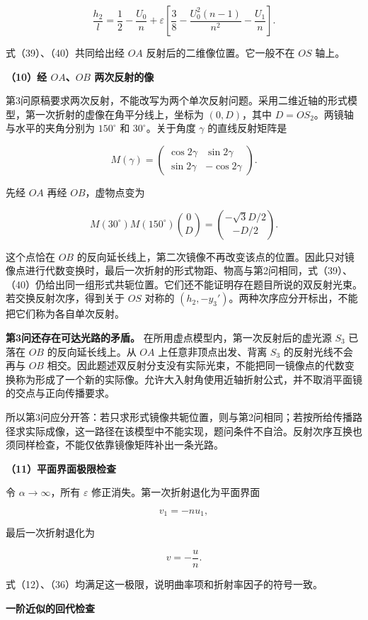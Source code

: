 \documentclass[12pt,a4paper,UTF8]{ctexart}
\begin{document}
\[
\boxed{
\frac{h_2}{l}
=\frac12-\frac{U_0}{n}
+\varepsilon
\left[
\frac38-\frac{U_0^2(n-1)}{n^2}-\frac{U_1}{n}
\right]
}.
\tag{40}
\]

式（39）、（40）共同给出经 \(OA\) 反射后的二维像位置。它一般不在 \(OS\)
轴上。

\textbf{（10）经 \(OA\)、\(OB\) 两次反射的像}

第3问原稿要求两次反射，不能改写为两个单次反射问题。采用二维近轴的形式模型，第一次折射的虚像在角平分线上，坐标为
\((0,D)\)，其中 \(D=OS_2\)。两镜轴与水平的夹角分别为 \(150^\circ\) 和
\(30^\circ\)。关于角度 \(\gamma\) 的直线反射矩阵是

\[M(\gamma)=\begin{pmatrix}\cos2\gamma&\sin2\gamma\\\sin2\gamma&-\cos2\gamma\end{pmatrix}.\]

先经 \(OA\) 再经 \(OB\)，虚物点变为

\[M(30^\circ)M(150^\circ)\binom0D=\binom{-\sqrt3D/2}{-D/2}.\]

这个点恰在 \(OB\)
的反向延长线上，第二次镜像不再改变该点的位置。因此只对镜像点进行代数变换时，最后一次折射的形式物距、物高与第2问相同，式（39）、（40）仍给出同一组形式共轭位置。它们还不能证明存在题目所说的双反射光束。若交换反射次序，得到关于
\(OS\) 对称的
\((h_2,-y_3')\)。两种次序应分开标出，不能把它们称为各自单次反射。

\textbf{第3问还存在可达光路的矛盾。}
在所用虚点模型内，第一次反射后的虚光源 \(S_3\) 已落在 \(OB\)
的反向延长线上。从 \(OA\) 上任意非顶点出发、背离 \(S_3\)
的反射光线不会再与 \(OB\)
相交。因此题述双反射分支没有实际光束，不能把同一镜像点的代数变换称为形成了一个新的实际像。允许大入射角使用近轴折射公式，并不取消平面镜的交点与正向传播要求。

所以第3问应分开答：若只求形式镜像共轭位置，则与第2问相同；若按所给传播路径求实际成像，这一路径在该模型中不能实现，题问条件不自洽。反射次序互换也须同样检查，不能仅依靠镜像矩阵补出一条光路。

\textbf{（11）平面界面极限检查}

令 \(\alpha\to\infty\)，所有 \(\varepsilon\)
修正消失。第一次折射退化为平面界面

\[
v_1=-nu_1,
\]

最后一次折射退化为

\[
v=-\frac un.
\]

式（12）、（36）均满足这一极限，说明曲率项和折射率因子的符号一致。

\textbf{一阶近似的回代检查}
\end{document}
